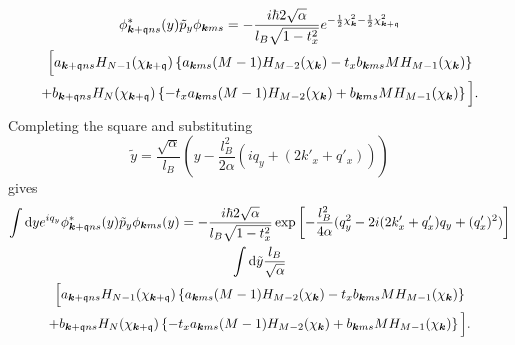 \begin{multline}
  \phi ^{*} _{\bm{k} + \mathfrak{q} ns} (y) \tilde{p}_{y} \phi _{\bm{k} m s}
  = -\frac{i\hbar 2 \sqrt{\alpha } }{l_{B} \sqrt{1 - t_{x}^2} }
  e^{-\frac{1}{2} \chi _{\bm{k}}^2 - \frac{1}{2} \chi _{\bm{k} + \mathfrak{q}} ^2}\\
  \Big[
  a_{\bm{k} + \mathfrak{q} ns} H_{N-1}(\chi_{\bm{k}+\mathfrak{q}})
  \left\{a_{\bm{k} ms} (M-1) H_{M-2} (\chi_{\bm{k}}) - t_{x} b_{\bm{k} ms} M H_{M-1} (\chi_{\bm{k}})\right\}\\
  +
  b_{\bm{k} + \mathfrak{q} ns} H_{N} (\chi_{\bm{k} + \mathfrak{q}})
  \left\{-t_{x} a_{\bm{k} ms} (M-1) H_{M-2} (\chi_{\bm{k}}) + b_{\bm{k} ms} M H_{M-1} (\chi_{\bm{k}})\right\}
  \Big].
\end{multline}
Completing the square and substituting
\[
  \tilde{y} = \frac{\sqrt{ \alpha  }}{l_{B}}
  \left(y - \frac{l_{B}^2}{2 \alpha } (i q_{y} + (2 k'_x + q' _x) ) \right)
\]
gives
\begin{multline}
  \int \mathrm{d}y
  e^{i q_{y}}
  \phi ^{*}_{\bm{k} + \mathfrak{q} ns}(y) \tilde{p}_{y}
  \phi_{\bm{k} ms} (y)
  =
  - \frac{i\hbar 2 \sqrt{\alpha} }{l_{B} \sqrt{1 - t_{x}^2} }
  \exp
  \left[
    - \frac{l_{B}^2}{4 \alpha } (q_{y}^2 - 2 i (2k' _x + q' _x) q_{y} + (q' _x)^2 )
  \right  ]\\
  \int \mathrm{d} \tilde{y} \frac{l_{B}}{\sqrt{\alpha } }\\
  \Big[
  a_{\bm{k} + \mathfrak{q} ns} H_{N-1}( \chi _{\bm{k} + \mathfrak{q}} )
  \left\{
    a_{\bm{k} ms} (M-1) H_{M-2} ( \chi _{\bm{k}} )
    - t_{x} b_{\bm{k} ms} M H_{M-1} ( \chi _{\bm{k}} ) \right\}\\
  +
  b_{\bm{k} + \mathfrak{q} ns} H_{N} ( \chi _{\bm{k} + \mathfrak{q}} )
  \left\{
    -t_{x} a_{\bm{k} ms} (M-1) H_{M-2} ( \chi _{\bm{k}} )
    + b_{\bm{k} ms} M H_{M-1} ( \chi _{\bm{k}} )
  \right\}
  \Big].
\end{multline}

